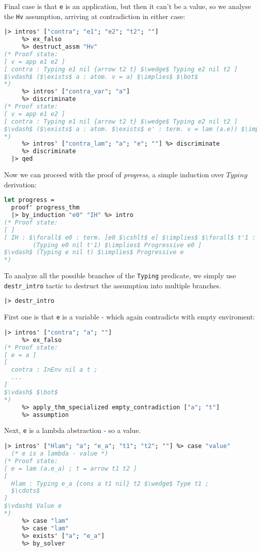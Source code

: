 \documentclass[english, mgr]{iithesis}
\renewcommand{\tt}[1]{\texttt{\small{#1}}}
\renewcommand{\it}[1]{\textit{#1}}
\begin{document}
Final case is that \tt{e} is an application, but then it can't be a value,
so we analyse the \tt{Hv} assumption, arriving at contradiction in either case:
\begin{lstlisting}[mathescape, language=OCaml]
  |> intros' ["contra"; "e1"; "e2"; "t2"; ""]
     %> ex_falso
     %> destruct_assm "Hv"
(* Proof state:
[ v = app e1 e2 ]
[ contra : Typing e1 nil {arrow t2 t} $\wedge$ Typing e2 nil t2 ]
$\vdash$ ($\exists$ a : atom. v = a) $\implies$ $\bot$
*)
     %> intros' ["contra_var"; "a"]
     %> discriminate
(* Proof state:
[ v = app e1 e2 ]
[ contra : Typing e1 nil {arrow t2 t} $\wedge$ Typing e2 nil t2 ]
$\vdash$ ($\exists$ a : atom. $\exists$ e' : term. v = lam (a.e)) $\implies$ $\bot$
*)
     %> intros' ["contra_lam"; "a"; "e"; ""] %> discriminate
     %> discriminate
  |> qed
\end{lstlisting}
Now we can proceed with the proof of \it{progress}, a simple induction over $Typing$ derivation:
\begin{lstlisting}[mathescape, language=OCaml]
let progress =
  proof' progress_thm
  |> by_induction "e0" "IH" %> intro
(* Proof state:
[ ]
[ IH : $\forall$ e0 : term. [e0 $\cshlt$ e] $\implies$ $\forall$ t'1 : term.
        (Typing e0 nil t'1) $\implies$ Progressive e0 ]
$\vdash$ (Typing e nil t) $\implies$ Progressive e
*)
\end{lstlisting}
To analyze all the possible branches of the \tt{Typing} predicate,
we simply use \tt{{destr\_intro}} tactic to destruct the assumption into multiple branches.
\begin{lstlisting}[language=OCaml]
  |> destr_intro
\end{lstlisting}
First one is that \tt{e} is a variable - which again contradicts with empty enviroment:
\begin{lstlisting}[language=OCaml, mathescape]
  |> intros' ["contra"; "a"; ""]
     %> ex_falso
(* Proof state:
[ e = a ]
[
  contra : InEnv nil a t ;
  ...
]
$\vdash$ $\bot$
*)
     %> apply_thm_specialized empty_contradiction ["a"; "t"]
     %> assumption
\end{lstlisting}
Next, \tt{e} is a lambda abstraction - so a value.
\begin{lstlisting}[mathescape, language=OCaml]
  |> intros' ["Hlam"; "a"; "e_a"; "t1"; "t2"; ""] %> case "value"
  (* e is a lambda - value *)
(* Proof state:
[ e = lam (a.e_a) ; t = arrow t1 t2 ]
[
  Hlam : Typing e_a {cons a t1 nil} t2 $\wedge$ Type t1 ;
  $\cdots$
]
$\vdash$ Value e
*)
     %> case "lam"
     %> case "lam"
     %> exists' ["a"; "e_a"]
     %> by_solver
\end{lstlisting}
\end{document}
